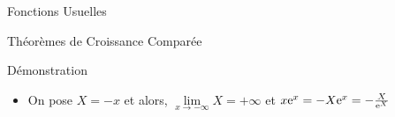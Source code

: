 \documentclass{coursbook}
\begin{document}
\begin{Gpartie}{Fonctions Usuelles}
\begin{Spartie}{Théorèmes de Croissance Comparée}
\begin{SSpartie}{Démonstration}
\begin{itemize}
                    Soit $f$ définie sur $\big]0~;+\infty\big[$ par $f(x)=\me^x-\frac{x^2}{2}$. Étudions les variations de $f$.

                    $f'(x)=\me^x-x$ on ne conclut pas directement sur le signe. Dérivons encore :

                    $f''(x)=\me^x-1\quad\text{et}\quad \me^x-1>0\iff \me^x>1\iff x>0$

                    Donc, $f''(x)$ est strictement positive pour $x>0$.

                    Ainsi on a $f'(x)$ strictement croissante sur $\big]0~;+\infty\big[$ et comme $f'(0)=1>0$, $f'$ est strictement positive sur $\big]0~;+\infty\big[$ :
                    
                    \begin{center}
                        \parbox{\linewidth}{}
                    \end{center} 
                    
                    Donc, pour tout $x\in\big]0~;+\infty\big[,~\me^x-\frac{x^2}{2}>0$ et donc $\me^x>\frac{x^2}{2}$ \\ Comme $x>0$ on peut diviser par $x$ : \\ Donc, $\frac{\me^x}{x}>\frac{x}{2}$ et comme $\lim\limits_{x\to+\infty}\frac{x}{2}=+\infty$, par comparaison : \[\lim\limits_{x\to+\infty}\frac{\me^x}{x}=+\infty\quad\square\]
                    \item On pose $X=-x$ et alors, $\lim\limits_{x\to-\infty}X=+\infty$ et $x\me^x=-X\me^{x}=-\frac{X}{\me^X}$
                    

\end{itemize}
\end{SSpartie}
\end{Spartie}
\end{Gpartie}
\end{document}
